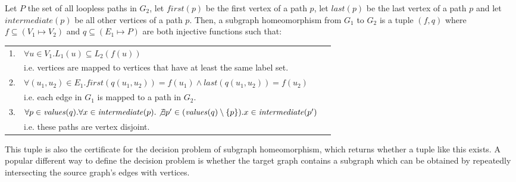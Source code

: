 \begin{defn}
Let $P$ the set of all loopless paths in $G_2$, let $\mathit{first}(p)$ be the first vertex of a path $p$, let $\mathit{last}(p)$ be the last vertex of a path $p$ and let $\mathit{intermediate}(p)$ be all other vertices of a path $p$. Then, a subgraph homeomorphism from $G_1$ to $G_2$ is a tuple $(f, q)$ where $f\subseteq (V_1 \mapsto V_2)$ and $q \subseteq (E_1 \mapsto P)$ are both injective functions such that:

\begin{tabular}{rlr}
 1. & $\forall u \in V_1 . L_1(u)\subseteq L_2(f(u))$&\\
 
 &i.e. vertices are mapped to vertices that have at least the same label set.&\\
 
 2. & $\forall (u_1, u_2) \in E_1 .\mathit{first}(q(u_1, u_2))=f(u_1) \land \mathit{last}(q(u_1, u_2))=f(u_2)$&\\
 &i.e. each edge in $G_1$ is mapped to a path in $G_2$.&\\
 
 3. & $\forall p \in \mathit{values}(q) . \forall x \in \mathit{intermediate}(p) . \not \exists p' \in (\mathit{values}(q) \setminus \{p\}) . x \in \mathit{intermediate}(p')$&\\
    &i.e. these paths are vertex disjoint.&\\
\end{tabular}

This tuple is also the certificate for the decision problem of subgraph homeomorphism, which returns whether a tuple like this exists. A popular different way to define the decision problem is whether the target graph contains a subgraph which can be obtained by repeatedly intersecting the source graph's edges with vertices.

\label{def:pathsubgraphisomorphism}
\end{defn}


